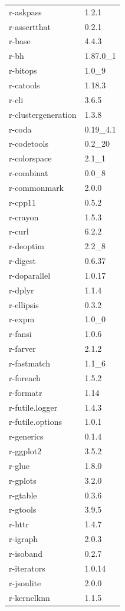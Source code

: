 \begin{longtable}{ll}
    r-askpass&1.2.1 \\
    r-assertthat&0.2.1 \\
    r-base&4.4.3 \\
    r-bh&1.87.0\_1 \\
    r-bitops&1.0\_9 \\
    r-catools&1.18.3 \\
    r-cli&3.6.5 \\
    r-clustergeneration&1.3.8 \\
    r-coda&0.19\_4.1 \\
    r-codetools&0.2\_20 \\
    r-colorspace&2.1\_1 \\
    r-combinat&0.0\_8 \\
    r-commonmark&2.0.0 \\
    r-cpp11&0.5.2 \\
    r-crayon&1.5.3 \\
    r-curl&6.2.2 \\
    r-deoptim&2.2\_8 \\
    r-digest&0.6.37 \\
    r-doparallel&1.0.17 \\
    r-dplyr&1.1.4 \\
    r-ellipsis&0.3.2 \\
    r-expm&1.0\_0 \\
    r-fansi&1.0.6 \\
    r-farver&2.1.2 \\
    r-fastmatch&1.1\_6 \\
    r-foreach&1.5.2 \\
    r-formatr&1.14 \\
    r-futile.logger&1.4.3 \\
    r-futile.options&1.0.1 \\
    r-generics&0.1.4 \\
    r-ggplot2&3.5.2 \\
    r-glue&1.8.0 \\
    r-gplots&3.2.0 \\
    r-gtable&0.3.6 \\
    r-gtools&3.9.5 \\
    r-httr&1.4.7 \\
    r-igraph&2.0.3 \\
    r-isoband&0.2.7 \\
    r-iterators&1.0.14 \\
    r-jsonlite&2.0.0 \\
    r-kernelknn&1.1.5 \\

\end{longtable}
